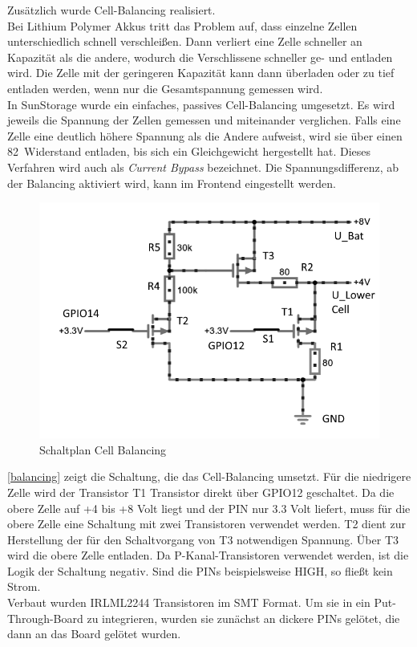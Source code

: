 \documentclass[12pt,a4paper,bibliography=totocnumbered,listof=totocnumbered]{article}
\begin{document}
Zusätzlich wurde Cell-Balancing realisiert.\\
Bei Lithium Polymer Akkus tritt das Problem auf, dass einzelne Zellen unterschiedlich schnell verschleißen.
Dann verliert eine Zelle schneller an Kapazität als die andere, wodurch die Verschlissene schneller ge- und entladen wird.
Die Zelle mit der geringeren Kapazität kann dann überladen oder zu tief entladen werden, wenn nur die Gesamtspannung gemessen wird.\\
In SunStorage wurde ein einfaches, passives Cell-Balancing umgesetzt. 
Es wird jeweils die Spannung der Zellen gemessen und miteinander verglichen.
Falls eine Zelle eine deutlich höhere Spannung als die Andere aufweist, wird sie über einen 82\textOmega \ Widerstand entladen, bis sich ein Gleichgewicht hergestellt hat. 
Dieses Verfahren wird auch als \emph{Current Bypass} bezeichnet. 
Die Spannungsdifferenz, ab der Balancing aktiviert wird, kann im Frontend eingestellt werden. \autocite[S. 111 - 127]{chargerBuch}\\
\begin{figure}[htpb] %
    \centering
    \includegraphics[width=15cm,keepaspectratio=true]{pics/balancing.png}
    \caption{Schaltplan Cell Balancing}\label{balancing}
\end{figure}

\autoref{balancing} zeigt die Schaltung, die das Cell-Balancing umsetzt.
Für die niedrigere Zelle wird der Transistor T1 Transistor direkt über GPIO12 geschaltet.
Da die obere Zelle auf +4 bis +8 Volt liegt und der PIN nur 3.3 Volt liefert, muss für die obere Zelle eine Schaltung mit zwei Transistoren verwendet werden.
T2 dient zur Herstellung der für den Schaltvorgang von T3 notwendigen Spannung.
Über T3 wird die obere Zelle entladen.
Da P-Kanal-Transistoren verwendet werden, ist die Logik der Schaltung negativ.
Sind die PINs beispielsweise HIGH, so fließt kein Strom.\\
Verbaut wurden IRLML2244 Transistoren im SMT Format. \autocite{irlml}
Um sie in ein Put-Through-Board zu integrieren, wurden sie zunächst an dickere PINs gelötet, die dann an das Board gelötet wurden.\\
\end{document}
